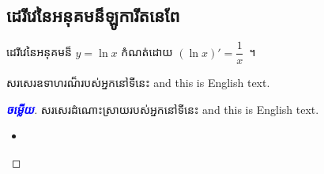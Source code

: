 \documentclass[a5paper,leqno,fleqn]{book}
\newcommand{\answer}{\textcolor{blue}{\bfseries ចម្លើយ}}
\begin{document}
	\subsection{ដេរីវេនៃអនុគមន៏ឡូការីតនេពែ}
	\vspace{1ex}
	\begin{multicols}{2}
	\begin{definition}{}{}
		ដេរីវេនៃអនុគមន៏ $ y=\ln x $ កំណត់ដោយ $ (\ln x)'=\dfrac{1}{x} $~។
	\end{definition}
	\begin{example}{}{}
		សរសេរឧទាហរណ៏របស់អ្នកនៅទីនេះ \textenglish{and this is English text.}
	\end{example}
	\end{multicols}
	\begin{proof}[\answer]
		សរសេរដំណោះស្រាយរបស់អ្នកនៅទីនេះ \textenglish{and this is English text.}
		\begin{itemize}
			\item 
		\end{itemize}
	\end{proof}
\end{document}
